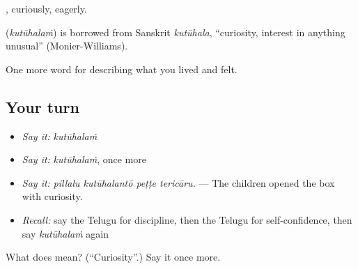 , curiously, eagerly.

\begin{cousinweb}
\textbf{} (\emph{kutūhalaṁ}) is borrowed from Sanskrit \emph{kutūhala}, \textquotedblleft{}curiosity, interest in anything unusual\textquotedblright{} (Monier-Williams).
\end{cousinweb}

\begin{grammarlens}[title={What you've built}]
One more word for describing what you lived and felt.
\end{grammarlens}

\subsection*{Your turn}
\begin{itemize}
\raggedright
  \item \emph{Say it:} \emph{kutūhalaṁ}
  \item \emph{Say it:} \emph{kutūhalaṁ}, once more
  \item \emph{Say it:} \emph{pillalu kutūhalantō peṭṭe tericāru.} — The children opened the box with curiosity.
  \item \emph{Recall:} say the Telugu for discipline, then the Telugu for self-confidence, then say \emph{kutūhalaṁ} again
\end{itemize}

\begin{tcolorbox}[breakable,colback=teal!4,colframe=teal!35!black,title={Before you move on}]
What does  mean? (\textquotedblleft{}Curiosity\textquotedblright{}.) Say it once more.
\end{tcolorbox}
